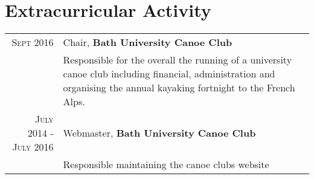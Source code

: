 \documentclass[a4paper,10pt]{article}
\begin{document}
\section{Extracurricular Activity}
\begin{tabular}{r|p{11cm}}
 \textsc{Sept} 2016 & Chair, \textbf{Bath University Canoe Club}\\& Responsible for the overall the running of a university canoe club including financial, administration and organising the annual kayaking fortnight to the French Alps. \\\
 \textsc{July} 2014 - \textsc{July} 2016 & Webmaster, \textbf{Bath University Canoe Club}\\ & Responsible maintaining the canoe clubs website
\end{tabular}



\end{document}
